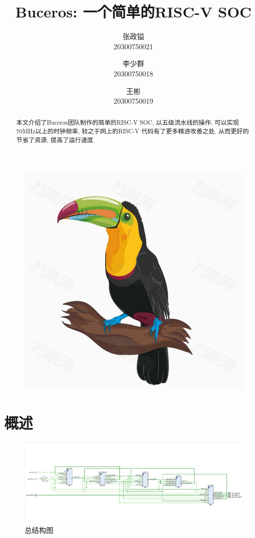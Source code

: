 \documentclass[lang=cn,11pt,a4paper,chinesefont=founder]{elegantpaper}
\title{Buceros: 一个简单的RISC-V SOC}
\author{张政镒 \\ 20300750021 \and 李少群 \\ 20300750018 \and 王彬 \\ 20300750019}
\institute{\href{https://github.com/0xtaruhi/Buceros}{Github项目链接}}
\date{\zhtoday}
\begin{document}
\maketitle
\begin{figure}[h]
    \centering
    \includegraphics[scale=0.1]{buceros}
\end{figure}
\begin{abstract}
    本文介绍了Buceros团队制作的简单的RISC-V SOC, 以五级流水线的操作, 可以实现70MHz以上的时钟频率, 较之于网上的RISC-V 代码有了更多精进改善之处, 从而更好的节省了资源, 提高了运行速度. 
\end{abstract}
		


\section{概述}
\begin{figure}[h]
    \centering
    \includegraphics[scale=0.4]{总结构图}
    \caption{总结构图}
\end{figure}
\end{document}
